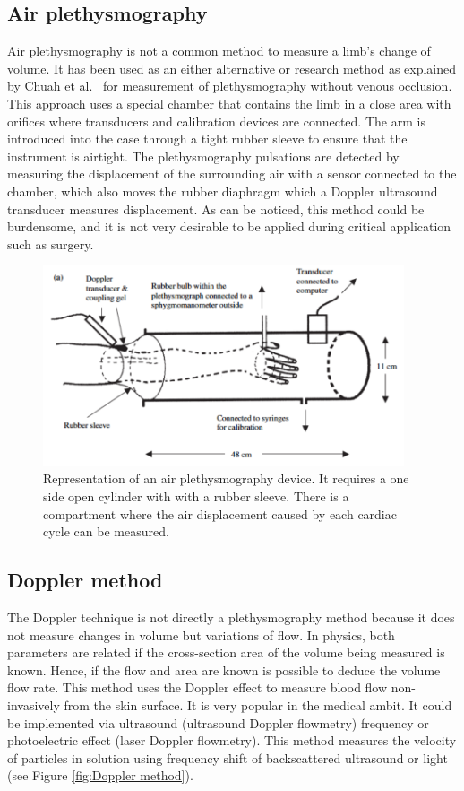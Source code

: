 \subsection{Air plethysmography}
\label{section literature 3.1}
Air plethysmography is not a common method to measure a limb’s change of volume. It has been used as an either alternative or research method as explained by Chuah et al.~\cite{chuah2004plethysmography} for measurement of plethysmography without venous occlusion. This approach uses a special chamber that contains the limb in a close area with orifices where transducers and calibration devices are connected. The arm is introduced into the case through a tight rubber sleeve to ensure that the instrument is airtight.  The plethysmography pulsations are detected by measuring the displacement of the surrounding air with a sensor connected to the chamber, which also moves the rubber diaphragm which a Doppler ultrasound transducer measures displacement. As can be noticed, this method could be burdensome, and it is not very desirable to be applied during critical application such as surgery.

\begin{figure}[!htpb]
	\centering
	\includegraphics[width=0.95\textwidth,keepaspectratio]{figure4}    
	\caption[Air plethysmography method]{Representation of an air plethysmography device. It requires a one side open cylinder with with a rubber sleeve. There is a compartment where the air displacement caused by each cardiac cycle can be measured.}
	\label{fig:air plethysmography}
\end{figure}

\subsection{Doppler method}
\label{section literature 3.2}
The Doppler technique is not directly a plethysmography method because it does not measure changes in volume but variations of flow. In physics, both parameters are related if the cross-section area of the volume being measured is known. Hence, if the flow and area are known is possible to deduce the volume flow rate. This method uses the Doppler effect to measure blood flow non-invasively from the skin surface. It is very popular in the medical ambit. It could be implemented via ultrasound (ultrasound Doppler flowmetry) frequency or photoelectric effect (laser Doppler flowmetry).  This method measures the velocity of particles in solution using frequency shift of backscattered ultrasound or light~\cite{orekhova2013doppler} (see Figure \ref{fig:Doppler method}). 

